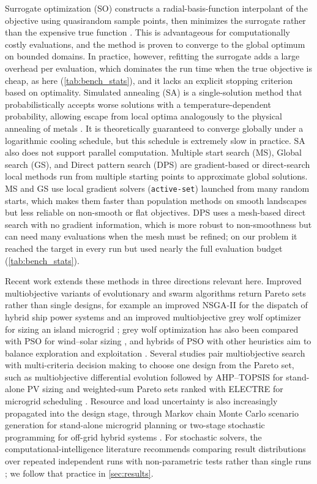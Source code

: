 \documentclass[final,3p,times]{elsarticle}
\begin{document}
Surrogate optimization (SO) constructs a radial-basis-function interpolant of the objective using quasirandom sample points, then minimizes the surrogate rather than the expensive true function \cite{gutmann2001}. This is advantageous for computationally costly evaluations, and the method is proven to converge to the global optimum on bounded domains. In practice, however, refitting the surrogate adds a large overhead per evaluation, which dominates the run time when the true objective is cheap, as here (\cref{tab:bench_stats}), and it lacks an explicit stopping criterion based on optimality. Simulated annealing (SA) is a single-solution method that probabilistically accepts worse solutions with a temperature-dependent probability, allowing escape from local optima analogously to the physical annealing of metals \cite{fathima2015}. It is theoretically guaranteed to converge globally under a logarithmic cooling schedule, but this schedule is extremely slow in practice. SA also does not support parallel computation. Multiple start search (MS), Global search (GS), and Direct pattern search (DPS) are gradient-based or direct-search local methods run from multiple starting points to approximate global solutions. MS and GS use local gradient solvers (\texttt{active-set}) launched from many random starts, which makes them faster than population methods on smooth landscapes but less reliable on non-smooth or flat objectives. DPS uses a mesh-based direct search with no gradient information, which is more robust to non-smoothness but can need many evaluations when the mesh must be refined; on our problem it reached the target in every run but used nearly the full evaluation budget (\cref{tab:bench_stats}).

Recent work extends these methods in three directions relevant here. Improved multiobjective variants of evolutionary and swarm algorithms return Pareto sets rather than single designs, for example an improved NSGA-II for the dispatch of hybrid ship power systems \cite{wang2024nsga} and an improved multiobjective grey wolf optimizer for sizing an island microgrid \cite{zhu2020imogwo}; grey wolf optimization has also been compared with PSO for wind--solar sizing \cite{geleta2022gwo}, and hybrids of PSO with other heuristics aim to balance exploration and exploitation \cite{javidrad2017psosa}. Several studies pair multiobjective search with multi-criteria decision making to choose one design from the Pareto set, such as multiobjective differential evolution followed by AHP--TOPSIS for stand-alone PV sizing \cite{muhsen2019mode} and weighted-sum Pareto sets ranked with ELECTRE for microgrid scheduling \cite{karimi2019madm}. Resource and load uncertainty is also increasingly propagated into the design stage, through Markov chain Monte Carlo scenario generation for stand-alone microgrid planning \cite{bakhtiari2021mcmc} or two-stage stochastic programming for off-grid hybrid systems \cite{calabrese2026tssp}. For stochastic solvers, the computational-intelligence literature recommends comparing result distributions over repeated independent runs with non-parametric tests rather than single runs \cite{derrac2011tutorial,carrasco2020trends}; we follow that practice in \cref{sec:results}.
\end{document}
